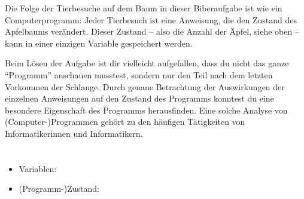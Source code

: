 {{Die Folge der Tierbesuche auf dem Baum in dieser Biberaufgabe ist wie ein Computerprogramm: Jeder Tierbesuch ist eine Anweisung, die den Zustand des Apfelbaums verändert. Dieser Zustand – also die Anzahl der Äpfel, siehe oben – kann in einer einzigen Variable gespeichert werden.

Beim Lösen der Aufgabe ist dir vielleicht aufgefallen, dass du nicht das ganze “Programm” anschauen musstest, sondern nur den Teil nach dem letzten Vorkommen der Schlange.  Durch genaue Betrachtung der Auswirkungen der einzelnen Anweisungen auf den Zustand des Programms konntest du eine besondere Eigenschaft des Programms herausfinden.  Eine solche Analyse von (Computer-)Programmen gehört zu den häufigen Tätigkeiten von Informatikerinnen und Informatikern.



\section*{\BrochureWebsitesAndKeywords}
{\raggedright
\begin{itemize}
  \item Variablen: \href{https://de.wikipedia.org/wiki/Variable_(Programmierung)}{}
  \item (Programm-)Zustand: \href{https://media.kswillisau.ch/in/zustand/zustand.html}{}
\end{itemize}


}

}{}

\def\AuthorChanS{} %
\def\AuthorDagieneV{} %
\def\AuthorGaalB{} %
\def\AuthorDatzkoC{} %
\def\AuthorBaumannW{} %
\def\AuthorDatzkoThutS{} %
\def\AuthorPohlW{} %

\newpage}{}

